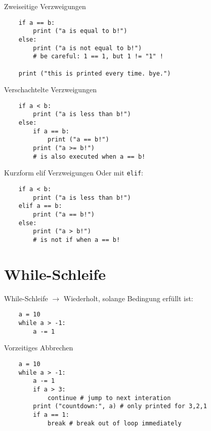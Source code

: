 \begin{frame}[fragile]{Zweiseitige Verzweigungen}
    \begin{lstlisting}
    if a == b:
        print ("a is equal to b!")
    else:
        print ("a is not equal to b!")
        # be careful: 1 == 1, but 1 != "1" !
    
    print ("this is printed every time. bye.")
    \end{lstlisting}
\end{frame}

\begin{frame}[fragile]{Verschachtelte Verzweigungen}
    \begin{lstlisting}
    if a < b:
        print ("a is less than b!")
    else:
        if a == b:
            print ("a == b!")
        print ("a >= b!")
        # is also executed when a == b! 
    \end{lstlisting}
\end{frame}

\begin{frame}[fragile]{Kurzform elif Verzweigungen}
    Oder mit \texttt{elif}:
    \begin{lstlisting}
    if a < b:
        print ("a is less than b!")
    elif a == b:
        print ("a == b!")
    else:
        print ("a > b!")
        # is not if when a == b! 
    \end{lstlisting}
\end{frame}

\section{While-Schleife}

\begin{frame}[fragile]{While-Schleife}
    $\rightarrow$ Wiederholt, solange Bedingung erfüllt ist:
    \begin{lstlisting}
    a = 10
    while a > -1:
        a -= 1
    \end{lstlisting}
\end{frame}

\begin{frame}[fragile]{Vorzeitiges Abbrechen} 
    \begin{lstlisting}
    a = 10
    while a > -1:
        a -= 1
        if a > 3:
            continue # jump to next interation
        print ("countdown:", a) # only printed for 3,2,1
        if a == 1:
            break # break out of loop immediately
    \end{lstlisting}
\end{frame}

